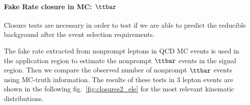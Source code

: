\paragraph{Fake Rate closure in MC: $\ttbar$}
Closure tests are necessary in order to test if we are able to predict the reducible background after the event selection requirements.

The fake rate extracted from nonprompt leptons in QCD MC events is used in the application region to estimate the nonprompt $\ttbar$ events in the signal region. Then we compare the observed number of nonprompt $\ttbar$ events using MC-truth information. The results of these tests in 3 lepton events are shown in the following fig.~\ref{fig:closures2_ele} for the most relevant kinematic distributions.

\begin{figure}[h]
\noindent
{}\\

\end{figure}
